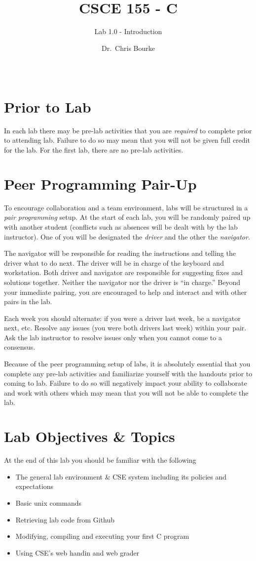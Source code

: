 \documentclass[12pt]{scrartcl}
\title{CSCE 155 - C}
\subtitle{Lab 1.0 - Introduction}
\author{Dr.\ Chris Bourke}
\date{~}
\begin{document}
\maketitle

\section*{Prior to Lab}

In each lab there may be pre-lab activities that you are \emph{required} to
complete prior to attending lab.  Failure to do so may mean that you will
not be given full credit for the lab.  For the first lab, there are no pre-lab
activities.

\section*{Peer Programming Pair-Up}

To encourage collaboration and a team environment, labs will be
structured in a \emph{pair programming} setup.  At the start of
each lab, you will be randomly paired up with another student 
(conflicts such as absences will be dealt with by the lab instructor).
One of you will be designated the \emph{driver} and the other
the \emph{navigator}.  

The navigator will be responsible for reading the instructions and
telling the driver what to do next.  The driver will be in charge of the
keyboard and workstation.  Both driver and navigator are responsible
for suggesting fixes and solutions together.  Neither the navigator
nor the driver is ``in charge.''  Beyond your immediate pairing, you
are encouraged to help and interact and with other pairs in the lab.

Each week you should alternate: if you were a driver last week, 
be a navigator next, etc.  Resolve any issues (you were both drivers
last week) within your pair.  Ask the lab instructor to resolve issues
only when you cannot come to a consensus.  

Because of the peer programming setup of labs, it is absolutely 
essential that you complete any pre-lab activities and familiarize
yourself with the handouts prior to coming to lab.  Failure to do
so will negatively impact your ability to collaborate and work with 
others which may mean that you will not be able to complete the
lab.  

\section{Lab Objectives \& Topics}
At the end of this lab you should be familiar with the following
\begin{itemize}
  \item The general lab environment \& CSE system including its policies and expectations
  \item Basic unix commands
  \item Retrieving lab code from Github
  \item Modifying, compiling and executing your first C program
  \item Using CSE's web handin and web grader
\end{itemize}
\end{document}
